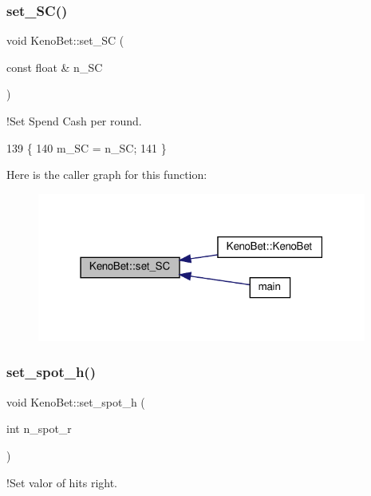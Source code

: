 \subsubsection{\texorpdfstring{set\+\_\+\+S\+C()}{set\_SC()}}
{\footnotesize\ttfamily void Keno\+Bet\+::set\+\_\+\+SC (\begin{DoxyParamCaption}\item[{const float \&}]{n\+\_\+\+SC }\end{DoxyParamCaption})}



!\+Set Spend Cash per round. 


\begin{DoxyCode}
139 \{
140     m\_SC = n\_SC;
141 \}
\end{DoxyCode}
Here is the caller graph for this function\+:
\nopagebreak
\begin{figure}[H]
\begin{center}
\leavevmode
\includegraphics[width=307pt]{classKenoBet_a4865fd866acc1500bde749d8d15ddf16_icgraph}
\end{center}
\end{figure}
\mbox{\label{classKenoBet_acdeff501accf00661e0151901bc888c0}} 
\subsubsection{\texorpdfstring{set\+\_\+spot\+\_\+h()}{set\_spot\_h()}}
{\footnotesize\ttfamily void Keno\+Bet\+::set\+\_\+spot\+\_\+h (\begin{DoxyParamCaption}\item[{int}]{n\+\_\+spot\+\_\+r }\end{DoxyParamCaption})}



!\+Set valor of hits right. 


